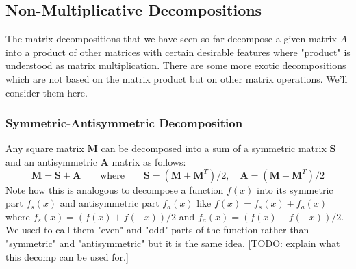 







\subsection{Non-Multiplicative Decompositions}
The matrix decompositions that we have seen so far decompose a given matrix $A$ into a product of other matrices with certain desirable features where "product" is understood as matrix multiplication. There are some more exotic decompositions which are not based on the matrix product but on other matrix operations. We'll consider them here.

\subsubsection{Symmetric-Antisymmetric Decomposition}
Any square matrix $\mathbf{M}$ can be decomposed into a sum of a symmetric matrix $\mathbf{S}$ and an antisymmetric $\mathbf{A}$ matrix as follows:
\begin{equation}
\mathbf{M} = \mathbf{S + A} \qquad \text{where}  \qquad
\mathbf{S} = (\mathbf{M} + \mathbf{M}^T) / 2,  \quad
\mathbf{A} = (\mathbf{M} - \mathbf{M}^T) / 2
\end{equation}
Note how this is analogous to decompose a function $f(x)$ into its symmetric part $f_s(x)$ and antisymmetric part $f_a(x)$ like $f(x) = f_s(x) + f_a(x)$ where $f_s(x) = (f(x) + f(-x)) / 2$ and $f_a(x) = (f(x) - f(-x)) / 2$. We used to call them "even" and "odd" parts of the function rather than "symmetric" and "antisymmetric" but it is the same idea. [TODO: explain what this decomp can be used for.]


